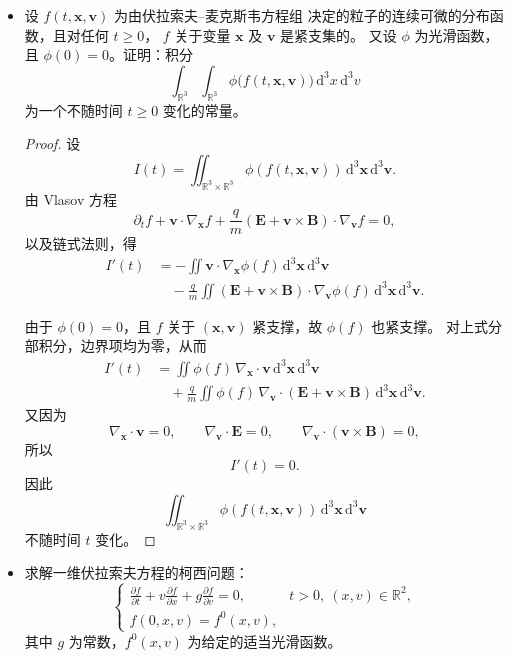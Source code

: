 \begin{itemize}
    \item[6.]设 $f(t,\boldsymbol{x},\boldsymbol{v})$ 为由伏拉索夫--麦克斯韦方程组
    决定的粒子的连续可微的分布函数，且对任何 $t\geq0$，
    $f$ 关于变量 $\boldsymbol{x}$ 及 $\boldsymbol{v}$ 是紧支集的。
    又设 $\phi$ 为光滑函数，且 $\phi(0)=0$。证明：积分
    $$
    \int_{\mathbb R^3}\int_{\mathbb R^3}
    \phi\bigl(f(t,\boldsymbol{x},\boldsymbol{v})\bigr)
    \,\mathrm d^3x\,\mathrm d^3v
    $$
    为一个不随时间 $t\geq0$ 变化的常量。

    \begin{proof}
设
\[
I(t)=\iint_{\mathbb R^3\times\mathbb R^3}
\phi(f(t,\boldsymbol x,\boldsymbol v))
\,\mathrm d^3\boldsymbol x\,\mathrm d^3\boldsymbol v.
\]
由 Vlasov 方程
\[
\partial_t f+\boldsymbol v\cdot\nabla_{\boldsymbol x}f
+\frac qm(\boldsymbol E+\boldsymbol v\times\boldsymbol B)
\cdot\nabla_{\boldsymbol v}f=0,
\]
以及链式法则，得
\[
\begin{aligned}
I'(t)
&=-\iint \boldsymbol v\cdot\nabla_{\boldsymbol x}\phi(f)
\,\mathrm d^3\boldsymbol x\,\mathrm d^3\boldsymbol v\\
&\quad-\frac qm\iint
(\boldsymbol E+\boldsymbol v\times\boldsymbol B)
\cdot\nabla_{\boldsymbol v}\phi(f)
\,\mathrm d^3\boldsymbol x\,\mathrm d^3\boldsymbol v.
\end{aligned}
\]

由于 \(\phi(0)=0\)，且 \(f\) 关于
\((\boldsymbol x,\boldsymbol v)\) 紧支撑，故 \(\phi(f)\) 也紧支撑。
对上式分部积分，边界项均为零，从而
\[
\begin{aligned}
I'(t)
&=\iint \phi(f)\,\nabla_{\boldsymbol x}\cdot\boldsymbol v
\,\mathrm d^3\boldsymbol x\,\mathrm d^3\boldsymbol v\\
&\quad+\frac qm\iint \phi(f)\,
\nabla_{\boldsymbol v}\cdot
(\boldsymbol E+\boldsymbol v\times\boldsymbol B)
\,\mathrm d^3\boldsymbol x\,\mathrm d^3\boldsymbol v.
\end{aligned}
\]
又因为
\[
\nabla_{\boldsymbol x}\cdot\boldsymbol v=0,
\qquad
\nabla_{\boldsymbol v}\cdot\boldsymbol E=0,
\qquad
\nabla_{\boldsymbol v}\cdot(\boldsymbol v\times\boldsymbol B)=0,
\]
所以
\[
I'(t)=0.
\]
因此
\[
\iint_{\mathbb R^3\times\mathbb R^3}
\phi(f(t,\boldsymbol x,\boldsymbol v))
\,\mathrm d^3\boldsymbol x\,\mathrm d^3\boldsymbol v
\]
不随时间 \(t\) 变化。
\end{proof}

    \item[7.]求解一维伏拉索夫方程的柯西问题：
    $$
    \begin{cases}
    \displaystyle
    \frac{\partial f}{\partial t}
    +v\frac{\partial f}{\partial x}
    +g\frac{\partial f}{\partial v}=0,
    &t>0,\ (x,v)\in\mathbb R^2,\\[2mm]
    f(0,x,v)=f^0(x,v),
    \end{cases}
    $$
    其中 $g$ 为常数，$f^0(x,v)$ 为给定的适当光滑函数。


\end{itemize}
